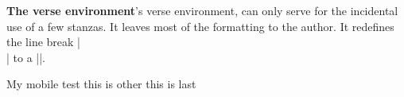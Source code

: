 \begin{teX}
\renewcommand\theenumiii{\@roman\c@enumiii}
\renewcommand\theenumiv{\@Alph\c@enumiv}
\newcommand\labelenumi{\theenumi.}
\newcommand\labelenumii{(\theenumii)}
\newcommand\labelenumiii{\theenumiii.}
\newcommand\labelenumiv{\theenumiv.}
\renewcommand\p@enumii{\theenumi}
\renewcommand\p@enumiii{\theenumi(\theenumii)}
\renewcommand\p@enumiv{\p@enumiii\theenumiii}
\newcommand\labelitemi{\textbullet}
\newcommand\labelitemii{\normalfont\bfseries \textendash}
\newcommand\labelitemiii{\textasteriskcentered}
\newcommand\labelitemiv{\textperiodcentered}
\newenvironment{description}
               {\list{}{\labelwidth\z@ \itemindent-\leftmargin
                        \let\makelabel\descriptionlabel}}
               {\endlist}
\newcommand*\descriptionlabel[1]{\hspace\labelsep
                                \normalfont\bfseries #1}
\end{teX}

\begin{multicols}{2}
\textbf{The verse environment}\quad \latex's verse environment, can only serve for the incidental use of a few stanzas. It leaves most of the formatting to the author.  It redefines the line break |\\| to a |\centercr|.
\end{multicols}

\begin{teX}
\newenvironment{verse}
    {\let\\\@centercr(*@\protect\footnote{This is defined in ltmiscen.dtx}@*)
     \list{}{\itemsep  \z@
             \itemindent   -1.5em%
             \listparindent\itemindent
             \rightmargin  \leftmargin
             \advance\leftmargin 1.5em}%
       \item\relax}
    {\endlist}
\end{teX}
\makeatletter
\newenvironment{Verse}
    {\let\\\@centercr%
     \list{}{\itemsep1pt
             \itemindent-1.5em%
             \listparindent\itemindent
             \rightmargin\leftmargin
             \advance\leftmargin 1.5em}%
       \item\relax}
    {\endlist}
\makeatother
\begin{teX}
  \begin{Verse}
     My mobile test\\
     this is other\\
     this is last\\
  \end{Verse}
\end{teX}

